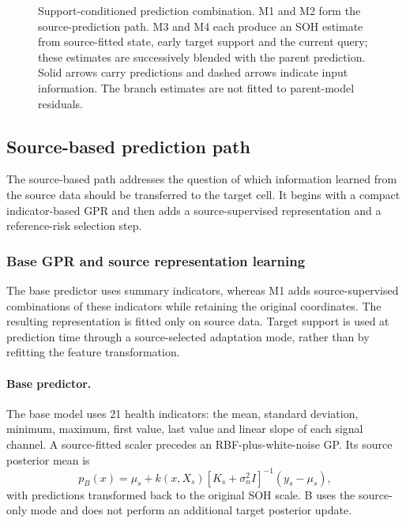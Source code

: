 \documentclass[preprint,12pt]{elsarticle}
\begin{document}
\begin{figure}[!htbp]\centering
\resizebox{.92\columnwidth}{!}{}
\caption{Support-conditioned prediction combination. M1 and M2 form the source-prediction path. M3 and M4 each produce an SOH estimate from source-fitted state, early target support and the current query; these estimates are successively blended with the parent prediction. Solid arrows carry predictions and dashed arrows indicate input information. The branch estimates are not fitted to parent-model residuals.}\label{fig:architecture}
\end{figure}

\subsection{Source-based prediction path}
The source-based path addresses the question of which information learned from the source data should be transferred to the target cell. It begins with a compact indicator-based GPR and then adds a source-supervised representation and a reference-risk selection step.
\subsubsection{Base GPR and source representation learning}
The base predictor uses summary indicators, whereas M1 adds source-supervised combinations of these indicators while retaining the original coordinates. The resulting representation is fitted only on source data. Target support is used at prediction time through a source-selected adaptation mode, rather than by refitting the feature transformation.

\paragraph{Base predictor.}
The base model uses 21 health indicators: the mean, standard deviation, minimum, maximum, first value, last value and linear slope of each signal channel. A source-fitted scaler precedes an RBF-plus-white-noise GP. Its source posterior mean is
\begin{equation}
p_B(x)=\mu_s+k(x,X_s)[K_s+\sigma_n^2I]^{-1}(y_s-\mu_s),
\end{equation}
with predictions transformed back to the original SOH scale. B uses the source-only mode and does not perform an additional target posterior update.
\end{document}
